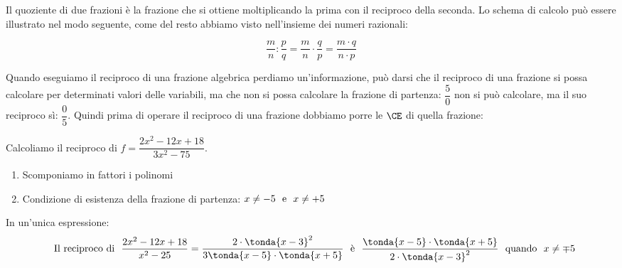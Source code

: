 Il quoziente di due frazioni è la frazione che si ottiene moltiplicando la 
prima con il reciproco della seconda.
Lo schema di calcolo può essere illustrato nel modo seguente, come del resto 
abbiamo visto nell'insieme dei numeri razionali:

\[\dfrac{m}{n}:\dfrac{p}{q}=\dfrac{m}{n} \cdot \dfrac{q}{p}=
  \dfrac{m \cdot q}{n \cdot p}\]


Quando eseguiamo il reciproco di una frazione algebrica perdiamo 
un'informazione, può darsi che il reciproco di una frazione si possa 
calcolare per determinati valori delle variabili, ma che non si possa 
calcolare la frazione di partenza:
\(\dfrac{5}{0}\) non si può calcolare, ma il suo reciproco sì: 
\(\dfrac{0}{5}\).
Quindi prima di operare il reciproco di una frazione dobbiamo porre le
\(\CE\) di quella frazione:

\begin{esempio}
Calcoliamo il reciproco di \(f=\dfrac{2x^2-12x+18}{3x^2-75}\).
\begin{enumerate}
\item Scomponiamo in fattori i polinomi
\item Condizione di esistenza della frazione di partenza: \quad
\(x \neq -5 \text{~~e~~} x \neq +5\)
\end{enumerate}
In un'unica espressione:
\[\stext{Il reciproco di} \dfrac{2x^2-12x+18}{x^2-25} =
  \dfrac{2\cdot \tonda{x-3}^2}{3\tonda{x-5} \cdot \tonda{x+5}}
\stext{è}
\dfrac{\tonda{x-5} \cdot \tonda{x+5}}{2\cdot \tonda{x-3}^2} \stext{quando}
x \neq \mp 5\]

\end{esempio}


